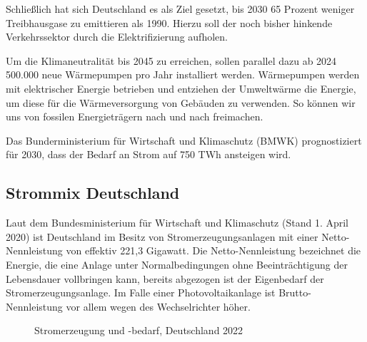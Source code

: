 \documentclass[12pt, a4paper]{article}
\begin{document}
Schließlich hat sich Deutschland es als Ziel gesetzt, bis 2030 65 Prozent weniger Treibhausgase zu emittieren als  1990. Hierzu soll der noch bisher hinkende Verkehrssektor durch die Elektrifizierung aufholen.

Um die Klimaneutralität bis 2045 zu erreichen, sollen parallel dazu ab 2024 500.000 neue Wärmepumpen pro Jahr installiert werden. Wärmepumpen werden mit elektrischer Energie betrieben und entziehen der Umweltwärme die Energie, um diese für die Wärmeversorgung von Gebäuden zu verwenden. So können wir uns von fossilen Energieträgern nach und nach freimachen.

Das Bunderministerium für Wirtschaft und Klimaschutz (BMWK) prognostiziert für 2030, dass der Bedarf an Strom auf 750 TWh ansteigen wird.

\subsection{Strommix Deutschland}

Laut dem Bundesministerium für Wirtschaft und Klimaschutz (Stand 1. April 2020) ist Deutschland im Besitz von Stromerzeugungsanlagen mit einer Netto-Nennleistung von effektiv 221,3 Gigawatt. Die Netto-Nennleistung bezeichnet die Energie, die eine Anlage unter Normalbedingungen ohne Beeinträchtigung der Lebensdauer vollbringen kann, bereits abgezogen ist der Eigenbedarf der Stromerzeugungsanlage. Im Falle einer Photovoltaikanlage ist Brutto-Nennleistung vor allem wegen des Wechselrichter höher. 

\begin{figure}
\centering
\def\svgwidth{450pt}
\fontsize{7}{10}\selectfont

\caption{Stromerzeugung und -bedarf, Deutschland 2022}
\label{fig:stromerzeugung_de_2022}
\end {figure}
\end{document}
